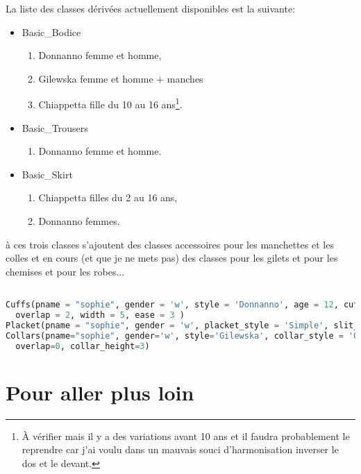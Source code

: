 \documentclass[10pt,a4paper,twoside]{report}
\begin{document}
La liste des classes dérivées actuellement disponibles est la suivante:
\begin{itemize}
  \item Basic\_Bodice
  \begin{enumerate}
    \item Donnanno femme et homme,
    \item Gilewska femme et homme + manches
    \item Chiappetta fille du 10 au 16 ans\footnote{À vérifier mais il y a des variations avant 10 ans et il faudra probablement le reprendre car j'ai voulu dans un mauvais souci d'harmonisation inverser le dos et le devant.}.
  \end{enumerate}
  \item Basic\_Trousers
  \begin{enumerate}
  \item Donnanno femme et homme.
  \end{enumerate}
  \item Basic\_Skirt
  \begin{enumerate}
    \item Chiappetta filles du 2 au 16 ans,
    \item Donnanno femmes.
  \end{enumerate}
\end{itemize}


à ces trois classes s'ajoutent des classes accessoires pour les manchettes et les colles
et en cours (et que je ne mets pas) des classes pour les gilets et pour les chemises et pour les robes...

\begin{lstlisting}[language=python]

Cuffs(pname = "sophie", gender = 'w', style = 'Donnanno', age = 12, cuff_style = 'Simple',\
  overlap = 2, width = 5, ease = 3 )
Placket(pname = "sophie", gender = 'w', placket_style = 'Simple', slit_length = 10)
Collars(pname="sophie", gender='w', style='Gilewska', collar_style = 'Officer',\
  overlap=0, collar_height=3)

\end{lstlisting}
\chapter{Pour aller plus loin}
\end{document}
